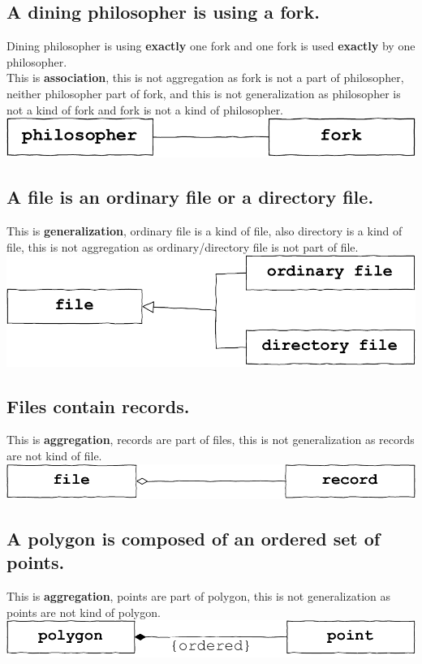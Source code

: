 \documentclass[12pt]{article}
\begin{document}
\subsection{A dining philosopher is using a fork.}
Dining philosopher is using \textbf{exactly} one fork and one fork is used \textbf{exactly} by one philosopher. \\ 
This is \textbf{association}, this is not aggregation as fork is not a part of philosopher, neither philosopher part of fork, and this is not generalization as philosopher is not a kind of fork and fork is not a kind of philosopher.
\\ \includegraphics[width=\textwidth]{31}
\subsection{A file is an ordinary file or a directory file. } 
This is \textbf{generalization}, ordinary file is a kind of file, also directory is a kind of file, this is not aggregation as ordinary/directory file is not part of file.
\\ \includegraphics[width=\textwidth]{32}

\subsection{Files contain records.}
This is \textbf{aggregation}, records are part of files, this is not generalization as records are not kind of file. 
\\ \includegraphics[width=\textwidth]{33}


\subsection{A polygon is composed of an ordered set of points. }
This is \textbf{aggregation}, points are part of polygon, this is not generalization as points are not kind of polygon. 
\\ \includegraphics[width=\textwidth]{34}
\end{document}
